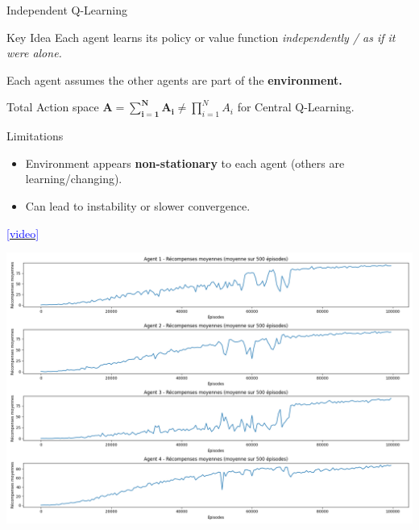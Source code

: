 \documentclass[aspectratio=169,xcolor=dvipsnames]{beamer}
\begin{document}
\begin{frame}{Independent Q-Learning}
     
    \begin{block}{Key Idea}
        Each agent learns its policy or value function \emph{independently / as if it were alone.}
        
        \medskip
        Each agent assumes the other agents are part of the \textbf{environment.}

        \medskip
        Total Action space $\boldsymbol{A = \sum_{i=1}^{N} A_i} \neq \prod_{i=1}^{N} A_i$ for Central Q-Learning.
    \end{block}
    
    \begin{minipage}{0.45\textwidth} 
        \begin{alertblock}{Limitations}
            \begin{itemize}
                \item Environment appears \textbf{non-stationary} to each agent (others are learning/changing).
                \item Can lead to instability or slower convergence.
            \end{itemize}
        \end{alertblock}

        \vspace{0.5em}
        {\href{https://raw.githubusercontent.com/edabier/MARL-project/main/game_gif/IQL10AGENT.gif}{\textcolor{blue}{[video]}}}
    \end{minipage}
    \hfill
    \begin{minipage}{0.5\textwidth}
        \centering
        \includegraphics[scale=0.15]{images/AAA.png}
    \end{minipage}
    
\end{frame}
\end{document}
